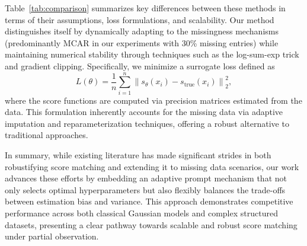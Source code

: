 \documentclass{article} %
\begin{document}
Table~\ref{tab:comparison} summarizes key differences between these methods in terms of their assumptions, loss formulations, and scalability. Our method distinguishes itself by dynamically adapting to the missingness mechanisms (predominantly MCAR in our experiments with 30\% missing entries) while maintaining numerical stability through techniques such as the log-sum-exp trick and gradient clipping. Specifically, we minimize a surrogate loss defined as
\[
L(\theta) = \frac{1}{n} \sum_{i=1}^n \left\| s_\theta(x_i) - s_{\mathrm{true}}(x_i) \right\|_2^2,
\]
where the score functions are computed via precision matrices estimated from the data. This formulation inherently accounts for the missing data via adaptive imputation and reparameterization techniques, offering a robust alternative to traditional approaches.

\begin{table}[h]
\centering
\renewcommand{\arraystretch}{2}
\caption{Comparison of related score matching methods.}
\label{tab:comparison}
\end{table}

In summary, while existing literature has made significant strides in both robustifying score matching and extending it to missing data scenarios, our work advances these efforts by embedding an adaptive prompt mechanism that not only selects optimal hyperparameters but also flexibly balances the trade-offs between estimation bias and variance. This approach demonstrates competitive performance across both classical Gaussian models and complex structured datasets, presenting a clear pathway towards scalable and robust score matching under partial observation.
\end{document}
